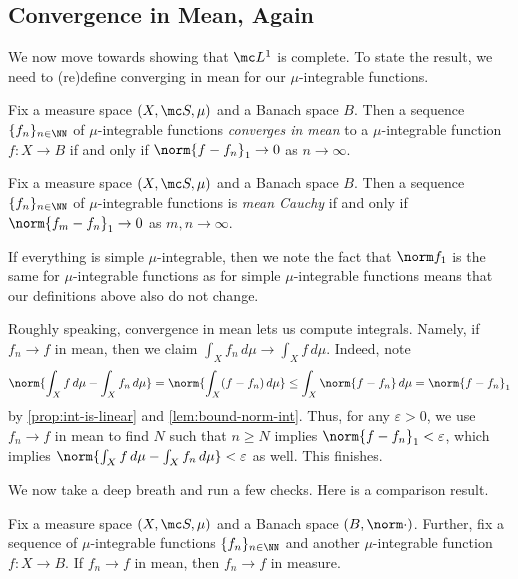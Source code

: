 \documentclass[../notes.tex]{subfiles}
\begin{document}
\subsection{Convergence in Mean, Again}
We now move towards showing that $\mc L^1$ is complete. To state the result, we need to (re)define converging in mean for our $\mu$-integrable functions.
\begin{definition}
	Fix a measure space $(X,\mc S,\mu)$ and a Banach space $B$. Then a sequence $\{f_n\}_{n\in\NN}$ of $\mu$-integrable functions \textit{converges in mean} to a $\mu$-integrable function $f\colon X\to B$ if and only if $\norm{f-f_n}_1\to0$ as $n\to\infty$.
\end{definition}
\begin{definition}
	Fix a measure space $(X,\mc S,\mu)$ and a Banach space $B$. Then a sequence $\{f_n\}_{n\in\NN}$ of $\mu$-integrable functions is \textit{mean Cauchy} if and only if $\norm{f_m-f_n}_1\to0$ as $m,n\to\infty$.
\end{definition}
\begin{remark}
	If everything is simple $\mu$-integrable, then we note the fact that $\norm f_1$ is the same for $\mu$-integrable functions as for simple $\mu$-integrable functions means that our definitions above also do not change.
\end{remark}
\begin{remark} \label{rem:converge-in-mean-computes-int}
	Roughly speaking, convergence in mean lets us compute integrals. Namely, if $f_n\to f$ in mean, then we claim $\int_Xf_n\,d\mu\to\int_Xf\,d\mu$. Indeed, note
	\[\norm{\int_Xf\,d\mu-\int_Xf_n\,d\mu}=\norm{\int_X(f-f_n)\,d\mu}\le\int_X\norm{f-f_n}\,d\mu=\norm{f-f_n}_1\]
	by \autoref{prop:int-is-linear} and \autoref{lem:bound-norm-int}. Thus, for any $\varepsilon>0$, we use $f_n\to f$ in mean to find $N$ such that $n\ge N$ implies $\norm{f-f_n}_1<\varepsilon$, which implies $\norm{\int_Xf\,d\mu-\int_Xf_n\,d\mu}<\varepsilon$ as well. This finishes.
\end{remark}
We now take a deep breath and run a few checks. Here is a comparison result.
\begin{lemma} \label{lem:converge-in-mean-to-converge-in-measure}
	Fix a measure space $(X,\mc S,\mu)$ and a Banach space $(B,\norm\cdot)$. Further, fix a sequence of $\mu$-integrable functions $\{f_n\}_{n\in\NN}$ and another $\mu$-integrable function $f\colon X\to B$. If $f_n\to f$ in mean, then $f_n\to f$ in measure.
\end{lemma}
\end{document}

